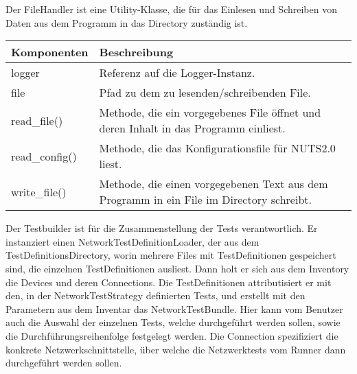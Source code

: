 \documentclass[]{subfiles}
\begin{document}
	Der FileHandler ist eine Utility-Klasse, die für das Einlesen und Schreiben von Daten aus dem Programm in das Directory zuständig ist.
	
	\begin{tabularx}{\textwidth}{lX}
		\toprule
			Komponenten & Beschreibung \\
		\midrule
			logger & Referenz auf die Logger-Instanz. \\
			file & Pfad zu dem zu lesenden/schreibenden File. \\
		\midrule
			read\_file() & Methode, die ein vorgegebenes File öffnet und deren Inhalt in das Programm einliest. \\
			read\_config() & Methode, die das Konfigurationsfile für NUTS2.0 liest. \\
			write\_file() & Methode, die einen vorgegebenen Text aus dem Programm in ein File im Directory schreibt. \\
		\bottomrule
	\end{tabularx}

	Der Testbuilder ist für die Zusammenstellung der Tests verantwortlich. 
	Er instanziert einen NetworkTestDefinitionLoader, der aus dem TestDefinitionsDirectory, worin mehrere Files mit TestDefinitionen gespeichert sind, die einzelnen TestDefinitionen ausliest.
	Dann holt er sich aus dem Inventory die Devices und deren Connections. 
	Die TestDefinitionen attributisiert er mit den, in der NetworkTestStrategy definierten Tests, und erstellt mit den Parametern aus dem Inventar das NetworkTestBundle. 
	Hier kann vom Benutzer auch die Auswahl der einzelnen Tests, welche durchgeführt werden sollen, sowie die Durchführungsreihenfolge festgelegt werden.
	Die Connection spezifiziert die konkrete Netzwerkschnittstelle, über welche die Netzwerktests vom Runner dann durchgeführt werden sollen.
\end{document}
